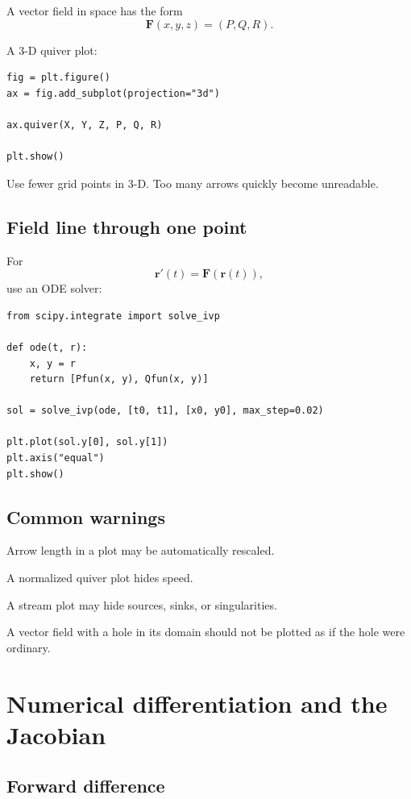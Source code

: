 A vector field in space has the form
\[
\boxed{
    \mathbf F(x,y,z)=(P,Q,R).
}
\]

A \(3\)-D quiver plot:

\begin{verbatim}
fig = plt.figure()
ax = fig.add_subplot(projection="3d")

ax.quiver(X, Y, Z, P, Q, R)

plt.show()
\end{verbatim}

Use fewer grid points in \(3\)-D.  Too many arrows quickly become unreadable.

\subsection*{Field line through one point}

For
\[
    \mathbf r'(t)=\mathbf F(\mathbf r(t)),
\]
use an ODE solver:

\begin{verbatim}
from scipy.integrate import solve_ivp

def ode(t, r):
    x, y = r
    return [Pfun(x, y), Qfun(x, y)]

sol = solve_ivp(ode, [t0, t1], [x0, y0], max_step=0.02)

plt.plot(sol.y[0], sol.y[1])
plt.axis("equal")
plt.show()
\end{verbatim}

\subsection*{Common warnings}

Arrow length in a plot may be automatically rescaled.

A normalized quiver plot hides speed.

A stream plot may hide sources, sinks, or singularities.

A vector field with a hole in its domain should not be plotted as if the hole were
ordinary.

\section{Numerical differentiation and the Jacobian}
\label{app:G.3}

\subsection*{Forward difference}

